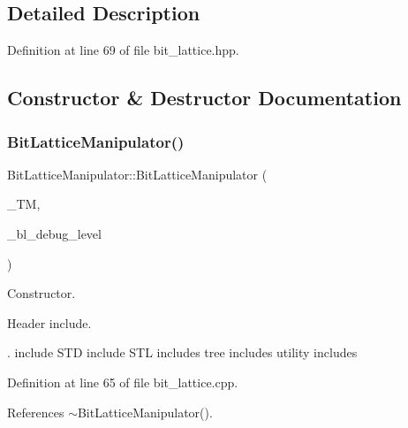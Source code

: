 \subsection{Detailed Description}


Definition at line 69 of file bit\+\_\+lattice.\+hpp.



\subsection{Constructor \& Destructor Documentation}
\mbox{\label{classBitLatticeManipulator_a17e7c6938897e42d193caab62b84a8de}} 
\subsubsection{\texorpdfstring{Bit\+Lattice\+Manipulator()}{BitLatticeManipulator()}}
{\footnotesize\ttfamily Bit\+Lattice\+Manipulator\+::\+Bit\+Lattice\+Manipulator (\begin{DoxyParamCaption}\item[{const \hyperlink{tree__manager_8hpp_a792e3f1f892d7d997a8d8a4a12e39346}{tree\+\_\+manager\+Const\+Ref}}]{\+\_\+\+TM,  }\item[{const int}]{\+\_\+bl\+\_\+debug\+\_\+level }\end{DoxyParamCaption})\hspace{0.3cm}{\ttfamily [explicit]}}



Constructor. 

Header include.

. include S\+TD include S\+TL includes tree includes utility includes 

Definition at line 65 of file bit\+\_\+lattice.\+cpp.



References $\sim$\+Bit\+Lattice\+Manipulator().

